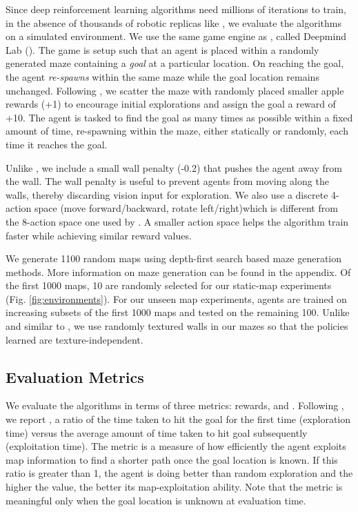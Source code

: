 Since deep reinforcement learning algorithms need millions of iterations to train, in the absence of thousands of robotic replicas like \cite{LePaKrISER2017}, we evaluate the algorithms on a simulated environment.
We use the same game engine as \cite{MiPaViICLR2017}, called Deepmind Lab (\cite{BeLeTeARXIV2016}).
The game is setup such that an agent is placed within a randomly generated maze containing a \emph{goal} at a particular location.
On reaching the goal, the agent \emph{re-spawns} within the same maze while the goal location remains unchanged. 
Following \cite{MiPaViICLR2017}, we scatter the maze with randomly placed smaller apple rewards (+1) to encourage initial explorations and assign the goal a reward of +10.
The agent is tasked to find the goal as many times as possible within a fixed amount of time, re-spawning within the maze, either statically or randomly, each time it reaches the goal.

Unlike \cite{MiPaViICLR2017}, we include a small wall penalty (-0.2) that pushes the agent away from the wall.
The wall penalty is useful to prevent agents from moving along the walls, thereby discarding vision input for exploration.
We also use a discrete 4-action space (move forward/backward, rotate left/right)which is different from the 8-action space one used by \cite{MiPaViICLR2017}.
A smaller action space helps the algorithm train faster while achieving similar reward values.

We generate 1100 random maps using depth-first search based maze generation methods.
More information on maze generation can be found in the appendix. 
Of the first 1000 maps, 10 are randomly selected for our static-map experiments (Fig. \ref{fig:environments}). For our unseen map experiments, agents are trained on increasing subsets of the first 1000 maps and tested on the remaining 100.
Unlike \cite{MiPaViICLR2017} and similar to \cite{ChLaSaNIPS2016}, we use randomly textured walls in our mazes so that the policies learned are texture-independent.





\subsection{Evaluation Metrics}

We evaluate the algorithms in terms of three metrics: rewards, \emph{\LatencyOneGtOne{}} and \emph{\DistanceInefficiency{}}.
Following \cite{MiPaViICLR2017}, we report \emph{\LatencyOneGtOne{}}, a ratio of the time taken to hit the goal for the first time (exploration time) versus the average amount of time taken to hit goal subsequently (exploitation time).
The metric is a measure of how efficiently the agent exploits map information to find a shorter path once the goal location is known. 
If this ratio is greater than 1, the agent is doing better than random exploration and the higher the value, the better its map-exploitation ability.
Note that the metric is meaningful only when the goal location is unknown at evaluation time.


